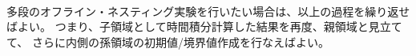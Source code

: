 \\

\noindent
多段のオフライン・ネスティング実験を行いたい場合は、以上の過程を繰り返せばよい。
つまり、子領域として時間積分計算した結果を再度、親領域と見立てて、
さらに内側の孫領域の初期値/境界値作成を行なえばよい。
